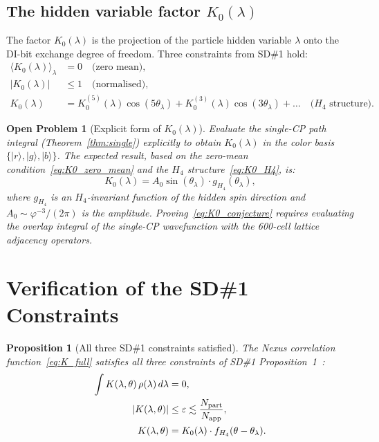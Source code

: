 \documentclass[11pt,letterpaper]{article}
\newtheorem{proposition}[theorem]{Proposition}
\newtheorem{openprob}[theorem]{Open Problem}
\newcommand{\phig}{\varphi}
\newcommand{\eps}{\varepsilon}
\newcommand{\Napp}{N_{\rm app}}
\newcommand{\Npart}{N_{\rm part}}
\newcommand{\ket}[1]{|#1\rangle}
\begin{document}
\subsection{The hidden variable factor $K_0(\lambda)$}

The factor $K_0(\lambda)$ is the projection of the particle
hidden variable $\lambda$ onto the DI-bit exchange degree of
freedom.  Three constraints from SD\#1 hold:
\begin{align}
\langle K_0(\lambda)\rangle_\lambda &= 0
  \quad\text{(zero mean)}, \label{eq:K0_zero_mean} \\
|K_0(\lambda)| &\leq 1
  \quad\text{(normalised)}, \label{eq:K0_bounded} \\
K_0(\lambda) &= K_0^{(5)}(\lambda)\cos(5\theta_\lambda)
  + K_0^{(3)}(\lambda)\cos(3\theta_\lambda) + \ldots
  \quad\text{($H_4$ structure)}. \label{eq:K0_H4}
\end{align}

\begin{openprob}[Explicit form of $K_0(\lambda)$]
\label{op:K0}
Evaluate the single-CP path integral (Theorem~\ref{thm:single})
explicitly to obtain $K_0(\lambda)$ in the color basis $\{\ket{r},
\ket{g}, \ket{b}\}$.  The expected result, based on the zero-mean
condition~\eqref{eq:K0_zero_mean} and the $H_4$
structure~\eqref{eq:K0_H4}, is:
\begin{equation}
K_0(\lambda) = A_0 \sin(\theta_\lambda) \cdot g_{H_4}(\theta_\lambda),
\label{eq:K0_conjecture}
\end{equation}
where $g_{H_4}$ is an $H_4$-invariant function of the hidden spin
direction and $A_0 \sim \phig^{-3}/(2\pi)$ is the amplitude.
Proving~\eqref{eq:K0_conjecture} requires evaluating the overlap
integral of the single-CP wavefunction with the 600-cell lattice
adjacency operators.
\end{openprob}

\section{Verification of the SD\#1 Constraints}
\label{sec:verification}

\begin{proposition}[All three SD\#1 constraints satisfied]
\label{prop:constraints}
The Nexus correlation function~\eqref{eq:K_full} satisfies all
three constraints of SD\#1 Proposition~1~\citep{cpp_sd1}:
\begin{align}
\int K(\lambda,\theta)\,\rho(\lambda)\,d\lambda &= 0,
  \label{eq:c1} \\
|K(\lambda,\theta)| &\leq \eps \lesssim \frac{\Npart}{\Napp},
  \label{eq:c2} \\
K(\lambda,\theta) &= K_0(\lambda) \cdot f_{H_4}(\theta - \theta_\lambda).
  \label{eq:c3}
\end{align}
\end{proposition}
\end{document}
